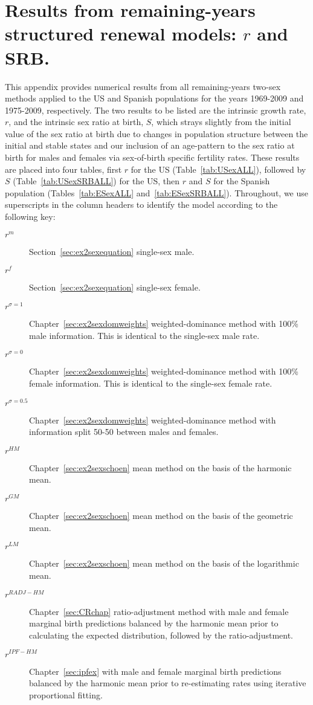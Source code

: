 
\chapter{Results from remaining-years structured renewal models: $r$ and SRB.}
\label{appendix:exallrestimates}

This appendix provides numerical results from all remaining-years two-sex
methods applied to the US and Spanish populations for the years 1969-2009 and
1975-2009, respectively. The two results to be listed are the intrinsic growth
rate, $r$, and the intrinsic sex ratio at birth, $S$, which strays slightly from
the initial value of the sex ratio at birth due to changes in population
structure between the initial and stable states and our inclusion of an
age-pattern to the sex ratio at birth for males and females via sex-of-birth
specific fertility rates. These results are placed into four tables, first $r$
for the US (Table~\ref{tab:USexALL}), followed by $S$
(Table~\ref{tab:USexSRBALL}) for the US, then $r$ and $S$ for the Spanish
population (Tables~\ref{tab:ESexALL} and~\ref{tab:ESexSRBALL}). Throughout, we
use superscripts in the column headers to identify the model according to the following key:
\begin{description}
  \item[$r^m$] Section~\ref{sec:ex2sexequation} single-sex male.
  \item[$r^f$] Section~\ref{sec:ex2sexequation} single-sex female.
  \item[$r^{\sigma=1}$] Chapter~\ref{sec:ex2sexdomweights} weighted-dominance
  method with 100\% male information. This is identical to the single-sex male rate.
  \item[$r^{\sigma=0}$] Chapter~\ref{sec:ex2sexdomweights} weighted-dominance
  method with 100\% female information. This is identical to the single-sex female rate.
  \item[$r^{\sigma=0.5}$] Chapter~\ref{sec:ex2sexdomweights} weighted-dominance
  method with information split 50-50 between males and females.
  \item[$r^{HM}$] Chapter~\ref{sec:ex2sexschoen} mean method on the basis of
  the harmonic mean.
  \item[$r^{GM}$] Chapter~\ref{sec:ex2sexschoen} mean method on the basis of
  the geometric mean.
  \item[$r^{LM}$] Chapter~\ref{sec:ex2sexschoen} mean method on the basis of
  the logarithmic mean.
  \item[$r^{RADJ-HM}$] Chapter~\ref{sec:CRchap} ratio-adjustment method with
  male and female marginal birth predictions balanced by the harmonic mean prior to
  calculating the expected distribution, followed by the ratio-adjustment.
  \item[$r^{IPF-HM}$] Chapter~\ref{sec:ipfex} with male and female marginal
  birth predictions balanced by the harmonic mean prior to re-estimating rates
  using iterative proportional fitting.
\end{description}

